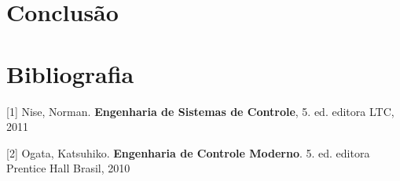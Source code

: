 \documentclass[journal]{IEEEtranTIE}
\begin{document}

\section{Conclusão}



 \section{Bibliografia}
[1] Nise, Norman. \textbf{Engenharia de Sistemas de Controle}, 5. ed. editora LTC, 2011

[2] Ogata, Katsuhiko. \textbf{Engenharia de Controle Moderno}. 5. ed. editora Prentice Hall Brasil, 2010
\end{document}
